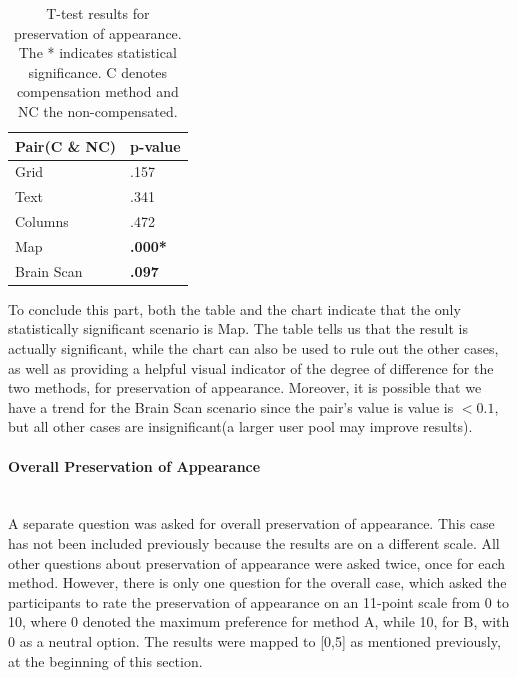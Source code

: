 \documentclass[]{article}
\begin{document}

\begin{table}
\begin{center}
    \begin{tabular}{ | l | l |}
    \hline
    \textbf{Pair(C \& NC)} & \textbf{p-value }\\ \hline
    Grid & .157 \\ \hline
    Text & .341 \\ \hline
    Columns & .472 \\ \hline
    Map & \textbf{.000*} \\ \hline
    Brain Scan & \textbf{.097} \\
    \hline
    \end{tabular}    
    
\end{center}
\caption{T-test results for preservation of appearance. The * indicates statistical significance. C denotes compensation method and NC the non-compensated.}
\label{table:POA_Test}
\end{table}

To conclude this part, both the table and the chart indicate that the only statistically significant scenario is Map. The table tells us that the result is actually significant, while the chart can also be used to rule out the other cases, as well as providing a helpful visual indicator of the degree of difference for the two methods, for preservation of appearance. Moreover, it is possible that we have a trend for the Brain Scan scenario since the pair's value is  value is $< 0.1$, but all other cases are insignificant(a larger user pool may improve results).

\paragraph{Overall Preservation of Appearance}\mbox{}\\

A separate question was asked for overall preservation of appearance. This case has not been included previously because the results are on a different scale. All other questions about preservation of appearance were asked twice, once for each method. However, there is only one question for the overall case, which asked the participants to rate the preservation of appearance on an 11-point scale from 0 to 10, where 0 denoted the maximum preference for method A, while 10, for B, with 0 as a neutral option. The results were mapped to [0,5] as mentioned previously, at the beginning of this section. 
\end{document}
